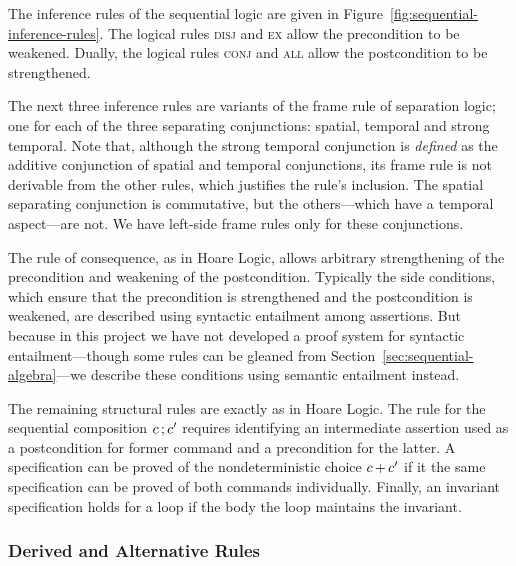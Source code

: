 \documentclass[11pt]{report}
\begin{document}
The inference rules of the sequential logic are given in Figure~\ref{fig:sequential-inference-rules}. The logical rules \textsc{disj} and \textsc{ex} allow the precondition to be weakened. Dually, the logical rules \textsc{conj} and \textsc{all} allow the postcondition to be strengthened. 

The next three inference rules are variants of the frame rule of separation logic; one for each of the three separating conjunctions: spatial, temporal and strong temporal. Note that, although the strong temporal conjunction is \emph{defined} as the additive conjunction of spatial and temporal conjunctions, its frame rule is not derivable from the other rules, which  justifies the rule's inclusion. The spatial separating conjunction is commutative, but the others---which have a temporal aspect---are not. We have left-side frame rules only for these conjunctions. 

The rule of consequence, as in Hoare Logic, allows arbitrary strengthening of the precondition and weakening of the postcondition. Typically the side conditions, which ensure that the precondition is strengthened and 
the postcondition is weakened, are described using syntactic entailment among assertions. But because in this project we have not developed a proof system for syntactic entailment---though some rules can be gleaned from Section~\ref{sec:sequential-algebra}---we describe these conditions using semantic entailment instead. 

The remaining structural rules are exactly as in Hoare Logic. The rule for the sequential composition $c \operatorname{;} c'$ requires identifying an intermediate assertion used as a postcondition for former command and a precondition for the latter. A specification can be proved of the nondeterministic choice $c \operatorname{+} c'$ if it the same specification can be proved of both commands individually. Finally, an invariant specification holds for a loop if the body the loop maintains the invariant. 

\subsubsection{Derived and Alternative Rules}
\end{document}
